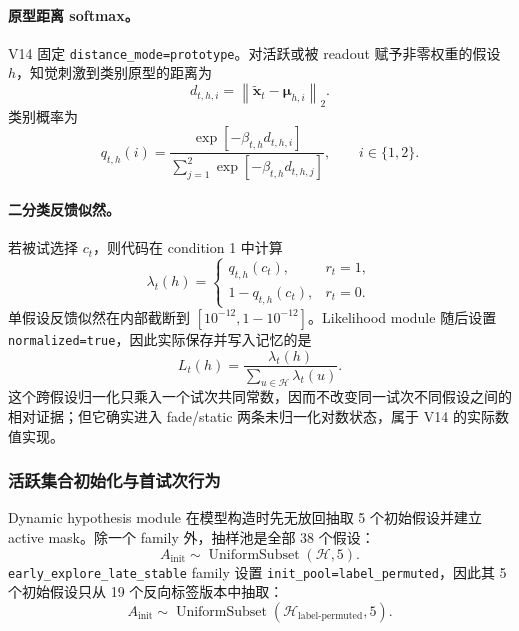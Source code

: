 \paragraph{原型距离 softmax。}
V14 固定 \texttt{distance\_mode=prototype}。对活跃或被 readout 赋予非零权重的假设 $h$，知觉刺激到类别原型的距离为
\begin{equation}
    d_{t,h,i}
    =
    \left\|
        \widetilde{\mathbf x}_t-\bm\mu_{h,i}
    \right\|_2.
    \label{eq:modelv14-prototype-distance}
\end{equation}
类别概率为
\begin{equation}
    q_{t,h}(i)
    =
    \frac{
        \exp[-\beta_{t,h}d_{t,h,i}]
    }{
        \sum_{j=1}^{2}
        \exp[-\beta_{t,h}d_{t,h,j}]
    },
    \qquad i\in\{1,2\}.
    \label{eq:modelv14-category-probability}
\end{equation}

\paragraph{二分类反馈似然。}
若被试选择 $c_t$，则代码在 condition 1 中计算
\begin{equation}
    \lambda_t(h)
    =
    \begin{cases}
        q_{t,h}(c_t),&r_t=1,\\
        1-q_{t,h}(c_t),&r_t=0.
    \end{cases}
    \label{eq:modelv14-raw-likelihood}
\end{equation}
单假设反馈似然在内部截断到 $[10^{-12},1-10^{-12}]$。Likelihood module 随后设置 \texttt{normalized=true}，因此实际保存并写入记忆的是
\begin{equation}
    L_t(h)
    =
    \frac{\lambda_t(h)}
    {\sum_{u\in\mathcal H}\lambda_t(u)}.
    \label{eq:modelv14-normalized-likelihood}
\end{equation}
这个跨假设归一化只乘入一个试次共同常数，因而不改变同一试次不同假设之间的相对证据；但它确实进入 fade/static 两条未归一化对数状态，属于 V14 的实际数值实现。


\subsubsection{活跃集合初始化与首试次行为}

Dynamic hypothesis module 在模型构造时先无放回抽取 5 个初始假设并建立 active mask。除一个 family 外，抽样池是全部 38 个假设：
\begin{equation}
    A_{\mathrm{init}}
    \sim
    \operatorname{UniformSubset}(\mathcal H,5).
    \label{eq:modelv14-init-all}
\end{equation}
\texttt{early\_explore\_late\_stable} family 设置 \texttt{init\_pool=label\_permuted}，因此其 5 个初始假设只从 19 个反向标签版本中抽取：
\begin{equation}
    A_{\mathrm{init}}
    \sim
    \operatorname{UniformSubset}
    (\mathcal H_{\mathrm{label\mbox{-}permuted}},5).
    \label{eq:modelv14-init-reversed}
\end{equation}

